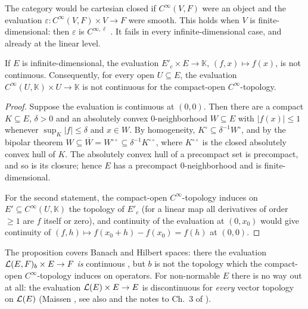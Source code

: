 The category would be cartesian closed if $C^\infty(V, F)$ were an object and the evaluation
$\varepsilon \colon C^\infty(V, F) \times V \to F$ were smooth. This holds when $V$ is
finite-dimensional: then $\varepsilon$ is $C^{\infty, \ell}$ \cite[Lemma~1.7.25]{GN26}. It
fails in every infinite-dimensional case, and already at the linear level.

\begin{proposition}
  \label{prop:evaluation-discontinuous}
  If $E$ is infinite-dimensional, the evaluation $E'_c \times E \to \mathbb{K}$,
  $(f, x) \mapsto f(x)$, is not continuous. Consequently, for every open
  $U \subseteq E$, the evaluation $C^\infty(U, \mathbb{K}) \times U \to \mathbb{K}$ is not
  continuous for the compact-open $C^\infty$-topology.
\end{proposition}

\begin{proof}
  Suppose the evaluation is continuous at $(0, 0)$. Then there are a compact $K \subseteq E$,
  $\delta > 0$ and an absolutely convex $0$-neighborhood $W \subseteq E$ with $|f(x)| \le 1$
  whenever $\sup_K |f| \le \delta$ and $x \in W$. By homogeneity, $K^\circ \subseteq
  \delta^{-1} W^\circ$, and by the bipolar theorem
  $W \subseteq \overline{W} = W^{\circ\circ} \subseteq \delta^{-1} K^{\circ\circ}$, where
  $K^{\circ\circ}$ is the closed absolutely convex hull of $K$. The absolutely convex hull of a
  precompact set is precompact, and so is its closure; hence $E$ has a precompact
  $0$-neighborhood and is finite-dimensional.

  For the second statement, the compact-open $C^\infty$-topology induces on
  $E' \subseteq C^\infty(U, \mathbb{K})$ the topology of $E'_c$ (for a linear map all
  derivatives of order $\ge 1$ are $f$ itself or zero), and continuity of the evaluation at
  $(0, x_0)$ would give continuity of $(f, h) \mapsto f(x_0 + h) - f(x_0) = f(h)$ at $(0, 0)$.
\end{proof}

The proposition covers Banach and Hilbert spaces: there the evaluation
$\mathcal{L}(E, F)_b \times E \to F$ \emph{is} continuous \cite[Rem.~2.3.9]{GN26}, but $b$ is not
the topology which the compact-open $C^\infty$-topology induces on operators. For non-normable
$E$ there is no way out at all: the evaluation $\mathcal{L}(E) \times E \to E$ is discontinuous for
\emph{every} vector topology on $\mathcal{L}(E)$ (Maissen \cite{Mai63}, see also \cite[p.~2]{KM97}
and the notes to Ch.~3 of \cite{GN26}).

